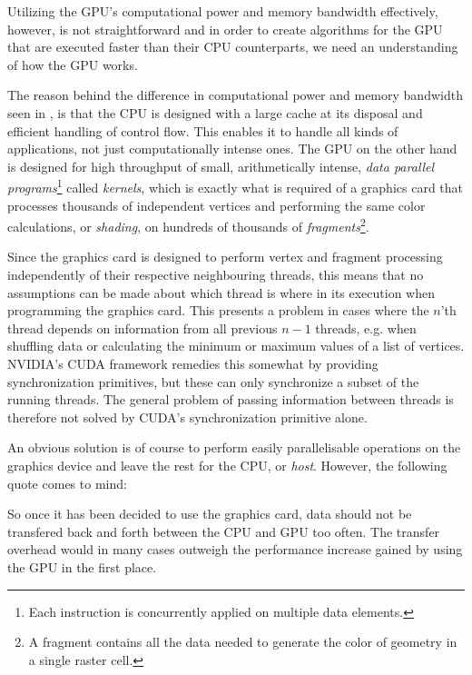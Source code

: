
Utilizing the GPU's computational power and memory bandwidth effectively,
however, is not straightforward and in order to create algorithms for the GPU
that are executed faster than their CPU counterparts, we need an understanding
of how the GPU works.

The reason behind the difference in computational power and memory bandwidth
seen in , is that the CPU is designed with a large
cache at its disposal and efficient handling of control flow. This enables it to
handle all kinds of applications, not just computationally intense ones. The GPU
on the other hand is designed for high throughput of small, arithmetically
intense, \textit{data parallel programs}\footnote{Each instruction is
  concurrently applied on multiple data elements.} called \textit{kernels},
which is exactly what is required of a graphics card that processes thousands of
independent vertices and performing the same color calculations, or
\textit{shading}, on hundreds of thousands of \textit{fragments}\footnote{A
  fragment contains all the data needed to generate the color of geometry in a
  single raster cell.}.

Since the graphics card is designed to perform vertex and fragment processing
independently of their respective neighbouring threads, this means that no
assumptions can be made about which thread is where in its execution when
programming the graphics card. This presents a problem in cases where the $n$'th
thread depends on information from all previous $n-1$ threads, e.g. when
shuffling data or calculating the minimum or maximum values of a list of
vertices. NVIDIA's CUDA framework remedies this somewhat by providing
synchronization primitives, but these can only synchronize a subset of the
running threads. The general problem of passing information between threads is
therefore not solved by CUDA's synchronization primitive alone.


An obvious solution is of course to perform easily parallelisable operations on
the graphics device and leave the rest for the CPU, or \textit{host}. However,
the following quote comes to mind:


So once it has been decided to use the graphics card, data should not be
transfered back and forth between the CPU and GPU too often. The transfer
overhead would in many cases outweigh the performance increase gained by using
the GPU in the first place.


